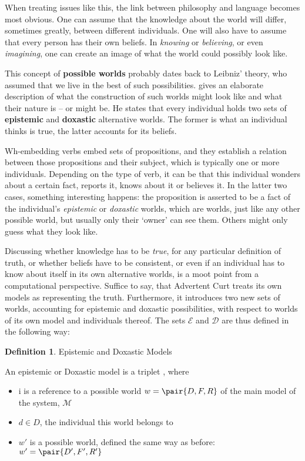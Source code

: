 \documentclass[notitlepage,twoside,a4paper]{scrreprt}
\newcommand{\term}[1]{\textsf{\textbf{#1}}} %
\newcommand{\pn}{\textsf} %
\newcommand{\acurt}{\pn{Advertent Curt}}
\theoremstyle{remark}
\theoremstyle{remark}
\theoremstyle{definition}
\newtheorem{definition}[thm]{Definition}
\theoremstyle{definition}
\begin{document}
When treating issues like this, the link between philosophy and language becomes
most obvious. One can assume that the knowledge about the world will differ,
sometimes greatly, between different individuals. One will also have to assume
that every person has their own beliefs. In \emph{knowing} or \emph{believing},
or even \emph{imagining}, one can create an image of what the world could
possibly look like.

This concept of \term{possible worlds} probably dates back to Leibniz' theory,
who assumed that we live in the best of such possibilities. \cite{lewis} gives
an elaborate description of what the construction of such worlds might look like
and what their nature is -- or might be. He states that every individual
holds two sets of \term{epistemic} and \term{doxastic} alternative worlds. The
former is what an individual thinks is true, the latter accounts for its
beliefs.

Wh-embedding verbs embed sets of propositions, and they establish a relation
between those propositions and their subject, which is typically one or more
individuals. Depending on the type of verb, it can be that this individual
wonders about a certain fact, reports it,  knows about it or believes it. In the
latter two cases, something interesting happens: the proposition is asserted to be a
fact of the individual's \emph{epistemic} or \emph{doxastic} worlds, which are
worlds, just like any other possible world, but usually only their `owner' can
see them. Others might only guess what they look like.

Discussing whether knowledge has to be \emph{true}, for any particular
definition of truth, or whether beliefs have to be consistent, or even if an
individual has to know about itself in its own alternative worlds, is a moot
point from a computational perspective. Suffice to say, that \acurt{} treats its
own models as representing the truth. Furthermore, it introduces two new sets of
worlds, accounting for epistemic and doxastic possibilities, with respect to
worlds of its own model and individuals thereof. The sets $\mathcal{E}$ and
$\mathcal{D}$ are thus defined in the following way:

\begin{definition}
  Epistemic and Doxastic Models

  An epistemic or Doxastic model is a triplet , where
  \begin{itemize}
    \item i is a reference to a possible world $w = \pair{D,F,R}$ of the main
    model of the system, $\mathcal{M}$
    \item $d \in D$, the individual this world belongs to
    \item $w'$ is a possible world, defined the same way as before: $w' =
    \pair{D',F',R'}$
  \end{itemize}
\end{definition}
\end{document}
